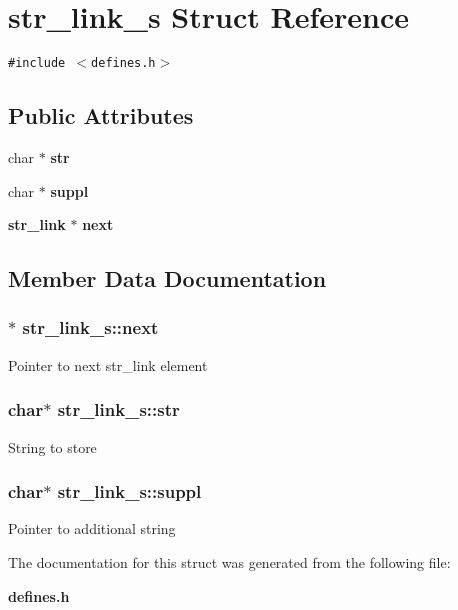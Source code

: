 \section{str\_\-link\_\-s  Struct Reference}
\label{structstr__link__s}
{\tt \#include $<$defines.h$>$}

\subsection*{Public Attributes}
\begin{CompactItemize}
\item 
char $\ast$ {\bf str}
\item 
char $\ast$ {\bf suppl}
\item 
{\bf str\_\-link} $\ast$ {\bf next}
\end{CompactItemize}


\subsection{Member Data Documentation}
\subsubsection{$\ast$ str\_\-link\_\-s::next}\label{structstr__link__s_m2}


Pointer to next str\_\-link element 
\subsubsection{\setlength{\rightskip}{0pt plus 5cm}char$\ast$ str\_\-link\_\-s::str}\label{structstr__link__s_m0}


String to store 
\subsubsection{\setlength{\rightskip}{0pt plus 5cm}char$\ast$ str\_\-link\_\-s::suppl}\label{structstr__link__s_m1}


Pointer to additional string 

The documentation for this struct was generated from the following file:\begin{CompactItemize}
\item 
{\bf defines.h}\end{CompactItemize}
